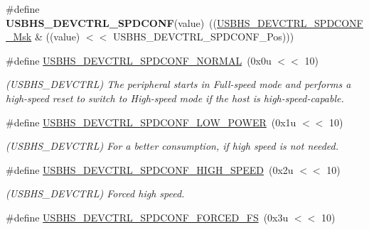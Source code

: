 \begin{DoxyCompactItemize}
\#define {\bfseries U\+S\+B\+H\+S\+\_\+\+D\+E\+V\+C\+T\+R\+L\+\_\+\+S\+P\+D\+C\+O\+NF}(value)~((\mbox{\hyperlink{group__SAMV71__USBHS_ga64a383ab4d768e9b4ef6f222682e32e3}{U\+S\+B\+H\+S\+\_\+\+D\+E\+V\+C\+T\+R\+L\+\_\+\+S\+P\+D\+C\+O\+N\+F\+\_\+\+Msk}} \& ((value) $<$$<$ U\+S\+B\+H\+S\+\_\+\+D\+E\+V\+C\+T\+R\+L\+\_\+\+S\+P\+D\+C\+O\+N\+F\+\_\+\+Pos)))
\item 
\mbox{\label{group__SAME70__USBHS_ga8aeda232c83e31425d34f20b500a0d42}} 
\#define \mbox{\hyperlink{group__SAME70__USBHS_ga8aeda232c83e31425d34f20b500a0d42}{U\+S\+B\+H\+S\+\_\+\+D\+E\+V\+C\+T\+R\+L\+\_\+\+S\+P\+D\+C\+O\+N\+F\+\_\+\+N\+O\+R\+M\+AL}}~(0x0u $<$$<$ 10)
\begin{DoxyCompactList}\small\item\em (U\+S\+B\+H\+S\+\_\+\+D\+E\+V\+C\+T\+RL) The peripheral starts in Full-\/speed mode and performs a high-\/speed reset to switch to High-\/speed mode if the host is high-\/speed-\/capable. \end{DoxyCompactList}\item 
\mbox{\label{group__SAME70__USBHS_gab54274fdc81182035ae7a3b747062872}} 
\#define \mbox{\hyperlink{group__SAME70__USBHS_gab54274fdc81182035ae7a3b747062872}{U\+S\+B\+H\+S\+\_\+\+D\+E\+V\+C\+T\+R\+L\+\_\+\+S\+P\+D\+C\+O\+N\+F\+\_\+\+L\+O\+W\+\_\+\+P\+O\+W\+ER}}~(0x1u $<$$<$ 10)
\begin{DoxyCompactList}\small\item\em (U\+S\+B\+H\+S\+\_\+\+D\+E\+V\+C\+T\+RL) For a better consumption, if high speed is not needed. \end{DoxyCompactList}\item 
\mbox{\label{group__SAME70__USBHS_ga36fde54725122e91aab3b6aa02b8ead3}} 
\#define \mbox{\hyperlink{group__SAME70__USBHS_ga36fde54725122e91aab3b6aa02b8ead3}{U\+S\+B\+H\+S\+\_\+\+D\+E\+V\+C\+T\+R\+L\+\_\+\+S\+P\+D\+C\+O\+N\+F\+\_\+\+H\+I\+G\+H\+\_\+\+S\+P\+E\+ED}}~(0x2u $<$$<$ 10)
\begin{DoxyCompactList}\small\item\em (U\+S\+B\+H\+S\+\_\+\+D\+E\+V\+C\+T\+RL) Forced high speed. \end{DoxyCompactList}\item 
\mbox{\label{group__SAME70__USBHS_gab584d8e60762259d587abf0b0a2750e0}} 
\#define \mbox{\hyperlink{group__SAME70__USBHS_gab584d8e60762259d587abf0b0a2750e0}{U\+S\+B\+H\+S\+\_\+\+D\+E\+V\+C\+T\+R\+L\+\_\+\+S\+P\+D\+C\+O\+N\+F\+\_\+\+F\+O\+R\+C\+E\+D\+\_\+\+FS}}~(0x3u $<$$<$ 10)
$$
\end{DoxyCompactItemize}
